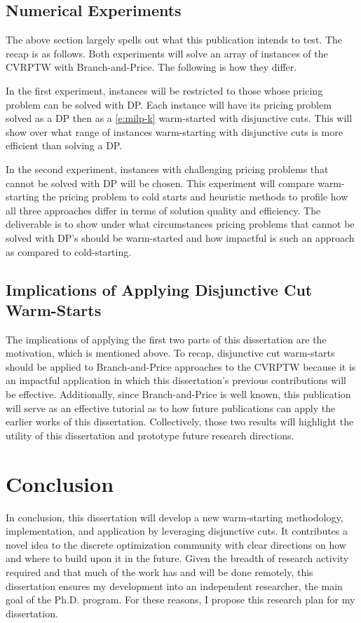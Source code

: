 \documentclass[10pt]{article}
\begin{document}
	\subsection{Numerical Experiments} \label{ss:apply_experiments}
	The above section largely spells out what this publication intends to test. The recap is as follows. Both experiments will solve an array of instances of the CVRPTW with Branch-and-Price. The following is how they differ.
	
	In the first experiment, instances will be restricted to those whose pricing problem can be solved with DP. Each instance will have its pricing problem solved as a DP then as a \ref{e:milp-k} warm-started with disjunctive cuts. This will show over what range of instances warm-starting with disjunctive cuts is more efficient than solving a DP.
	
	In the second experiment, instances with challenging pricing problems that cannot be solved with DP will be chosen. This experiment will compare warm-starting the pricing problem to cold starts and heuristic methods to profile how all three approaches differ in terms of solution quality and efficiency. The deliverable is to show under what circumstances pricing problems that cannot be solved with DP's should be warm-started and how impactful is such an approach as compared to cold-starting.
	
	\subsection{Implications of Applying Disjunctive Cut Warm-Starts} \label{ss:application_impllications}
	The implications of applying the first two parts of this dissertation are the motivation, which is mentioned above. To recap, disjunctive cut warm-starts should be applied to Branch-and-Price approaches to the CVRPTW because it is an impactful application in which this dissertation's previous contributions will be effective. Additionally, since Branch-and-Price is well known, this publication will serve as an effective tutorial as to how future publications can apply the earlier works of this dissertation. Collectively, those two results will highlight the utility of this dissertation and prototype future research directions.
		
	\section{Conclusion}\label{s:conclusion}
	In conclusion, this dissertation will develop a new warm-starting methodology, implementation, and application by leveraging disjunctive cuts. It contributes a novel idea to the discrete optimization community with clear directions on how and where to build upon it in the future. Given the breadth of research activity required and that much of the work has and will be done remotely, this dissertation ensures my development into an independent researcher, the main goal of the Ph.D. program. For these reasons, I propose this research plan for my dissertation.
	
	\newpage
	
	
	
	
\end{document}
